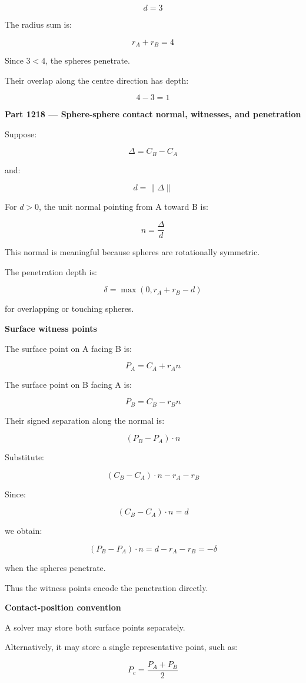 \[
d=3
\]

The radius sum is:

\[
r_A+r_B=4
\]

Since \(3<4\), the spheres penetrate.

Their overlap along the centre direction has depth:

\[
4-3=1
\]

\textbf{Part 1218 --- Sphere-sphere contact normal, witnesses, and penetration}

Suppose:

\[
\Delta=C_B-C_A
\]

and:

\[
d=\|\Delta\|
\]

For \(d>0\), the unit normal pointing from A toward B is:

\[
\boxed{ n=\frac{\Delta}{d} }
\]

This normal is meaningful because spheres are rotationally symmetric.

The penetration depth is:

\[
\boxed{ \delta=\max(0,r_A+r_B-d) }
\]

for overlapping or touching spheres.

\textbf{Surface witness points}

The surface point on A facing B is:

\[
\boxed{ P_A=C_A+r_An }
\]

The surface point on B facing A is:

\[
\boxed{ P_B=C_B-r_Bn }
\]

Their signed separation along the normal is:

\[
(P_B-P_A)\cdot n
\]

Substitute:

\[
(C_B-C_A)\cdot n-r_A-r_B
\]

Since:

\[
(C_B-C_A)\cdot n=d
\]

we obtain:

\[
\boxed{ (P_B-P_A)\cdot n=d-r_A-r_B=-\delta }
\]

when the spheres penetrate.

Thus the witness points encode the penetration directly.

\textbf{Contact-position convention}

A solver may store both surface points separately.

Alternatively, it may store a single representative point, such as:

\[
P_c=\frac{P_A+P_B}{2}
\]

